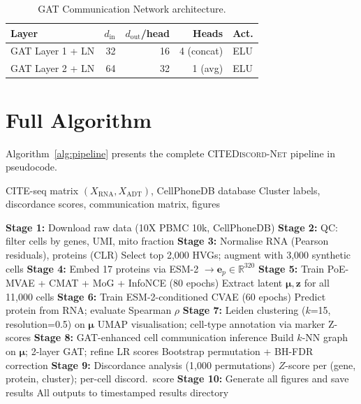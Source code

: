 \documentclass[11pt,a4paper]{article}
\newcommand{\citenet}{\textsc{CITEDiscord-Net}}
\newcommand{\RR}{\mathbb{R}}
\newcommand{\bz}{\mathbf{z}}
\newcommand{\bmu}{\boldsymbol{\mu}}
\begin{document}
\begin{table}[!ht]
\centering
\caption{GAT Communication Network architecture.}
\label{tab:gat_arch}
\scriptsize
\begin{tabular}{lrrrl}
\toprule
\textbf{Layer} & \textbf{$d_\text{in}$} & \textbf{$d_\text{out}$/head} & \textbf{Heads} & \textbf{Act.} \\
\midrule
GAT Layer 1 + LN & 32 & 16 & 4 (concat) & ELU \\
GAT Layer 2 + LN & 64 & 32 & 1 (avg)    & ELU \\
\bottomrule
\end{tabular}
\end{table}

\section{Full Algorithm}\label{app:algorithm}

Algorithm~\ref{alg:pipeline} presents the complete \citenet{} pipeline in pseudocode.

\begin{algorithm}[!ht]
\caption{\citenet{} Pipeline}
\label{alg:pipeline}
\begin{algorithmic}[1]
\REQUIRE CITE-seq matrix $(X_\text{RNA}, X_\text{ADT})$, CellPhoneDB database
\ENSURE Cluster labels, discordance scores, communication matrix, figures

\STATE \textbf{Stage 1:} Download raw data (10X PBMC 10k, CellPhoneDB)
\STATE \textbf{Stage 2:} QC: filter cells by genes, UMI, mito fraction
\STATE \textbf{Stage 3:} Normalise RNA (Pearson residuals), proteins (CLR)
\STATE Select top 2,000 HVGs; augment with 3,000 synthetic cells
\STATE \textbf{Stage 4:} Embed 17 proteins via ESM-2 $\to \mathbf{e}_p \in \RR^{320}$
\STATE \textbf{Stage 5:} Train PoE-MVAE + CMAT + MoG + InfoNCE (80 epochs)
\STATE Extract latent $\bmu, \bz$ for all 11,000 cells
\STATE \textbf{Stage 6:} Train ESM-2-conditioned CVAE (60 epochs)
\STATE Predict protein from RNA; evaluate Spearman $\rho$
\STATE \textbf{Stage 7:} Leiden clustering ($k$=15, resolution=0.5) on $\bmu$
\STATE UMAP visualisation; cell-type annotation via marker Z-scores
\STATE \textbf{Stage 8:} GAT-enhanced cell communication inference
\STATE Build $k$-NN graph on $\bmu$; 2-layer GAT; refine LR scores
\STATE Bootstrap permutation + BH-FDR correction
\STATE \textbf{Stage 9:} Discordance analysis (1,000 permutations)
\STATE $Z$-score per (gene, protein, cluster); per-cell discord.\ score
\STATE \textbf{Stage 10:} Generate all figures and save results
\RETURN All outputs to timestamped results directory
\end{algorithmic}
\end{algorithm}
\end{document}
